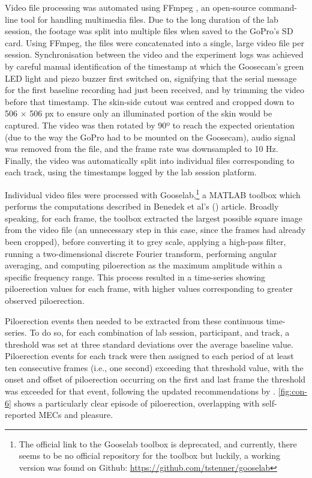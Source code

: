 Video file processing was automated using FFmpeg \parencite{tomar2006}, an open-source command-line tool for handling multimedia files. Due to the long duration of the lab session, the footage was split into multiple files when saved to the GoPro's SD card. Using FFmpeg, the files were concatenated into a single, large video file per session. Synchronisation between the video and the experiment logs was achieved by careful manual identification of the timestamp at which the Goosecam's green LED light and piezo buzzer first switched on, signifying that the serial message for the first baseline recording had just been received, and by trimming the video before that timestamp. The skin-side cutout was centred and cropped down to 506 $\times$ 506 px to ensure only an illuminated portion of the skin would be captured. The video was then rotated by 90º to reach the expected orientation (due to the way the GoPro had to be mounted on the Goosecam), audio signal was removed from the file, and the frame rate was downsampled to 10 Hz. Finally, the video was automatically split into individual files corresponding to each track, using the timestamps logged by the lab session platform.

Individual video files were processed with Gooselab,\footnote{The official link to the Gooselab toolbox is deprecated, and currently, there seems to be no official repository for the toolbox but luckily, a working version was found on Github: \url{https://github.com/tstenner/gooselab}} a MATLAB toolbox which performs the computations described in Benedek et al's (\citeyear{benedek2010}) article. Broadly speaking, for each frame, the toolbox extracted the largest possible square image from the video file (an unnecessary step in this case, since the frames had already been cropped), before converting it to grey scale, applying a high-pass filter, running a two-dimensional discrete Fourier transform, performing angular averaging, and computing piloerection as the maximum amplitude within a specific frequency range. This process resulted in a time-series showing piloerection values for each frame, with higher values corresponding to greater observed piloerection.

Piloerection events then needed to be extracted from these continuous time-series. To do so, for each combination of lab session, participant, and track, a threshold was set at three standard deviations over the average baseline value. Piloerection events for each track were then assigned to each period of at least ten consecutive frames (i.e., one second) exceeding that threshold value, with the onset and offset of piloerection occurring on the first and last frame the threshold was exceeded for that event, following the updated recommendations by \textcite{benedek2011}. \autoref{fig:con-6} shows a particularly clear episode of piloerection, overlapping with self-reported MECs and pleasure.

